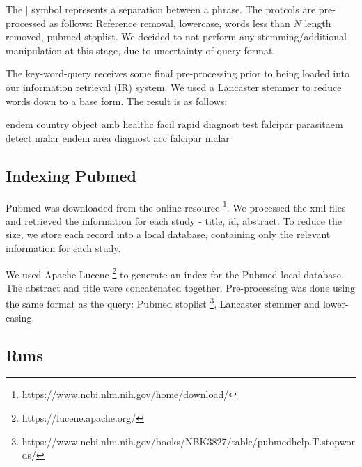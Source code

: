 The | symbol represents a separation between a phrase. The protcols are pre-processed as follows: Reference removal, lowercase, words less than $N$ length removed, pubmed stoplist. We decided to not perform any stemming/additional manipulation at this stage, due to uncertainty of query format.

The key-word-query receives some final pre-processing prior to being loaded into our information retrieval (IR) system. We used a Lancaster stemmer to reduce words down to a base form. The result is as follows:

\begin{tcolorbox}

endem country object amb healthc facil rapid diagnost test falcipar parasitaem detect malar endem area diagnost acc falcipar malar

\end{tcolorbox}

\subsection{Indexing Pubmed}

Pubmed was downloaded from the online resource \footnote{https://www.ncbi.nlm.nih.gov/home/download/}. We processed the xml files and retrieved the information for each study - title, id, abstract. To reduce the size, we store each record into a local database, containing only the relevant information for each study.

We used Apache Lucene \footnote{https://lucene.apache.org/} to generate an index for the Pubmed local database. The abstract and title were concatenated together. Pre-processing was done using the same format as the query: Pubmed stoplist \footnote{https://www.ncbi.nlm.nih.gov/books/NBK3827/table/pubmedhelp.T.stopwords/}, Lancaster stemmer and lower-casing. 


\subsection{Runs}

